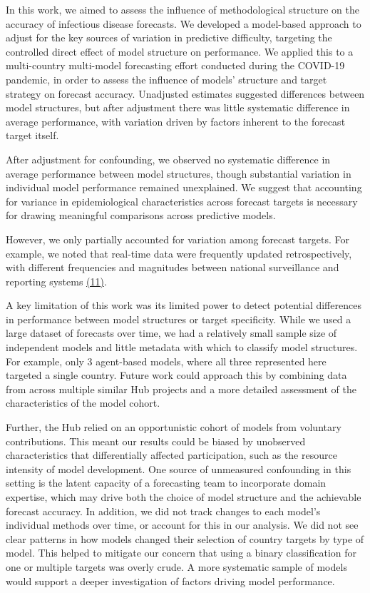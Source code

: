 \documentclass[
  letterpaper,
  DIV=11,
  numbers=noendperiod]{scrartcl}
\begin{document}
In this work, we aimed to assess the influence of methodological
structure on the accuracy of infectious disease forecasts. We developed
a model-based approach to adjust for the key sources of variation in
predictive difficulty, targeting the controlled direct effect of model
structure on performance. We applied this to a multi-country multi-model
forecasting effort conducted during the COVID-19 pandemic, in order to
assess the influence of models' structure and target strategy on
forecast accuracy. Unadjusted estimates suggested differences between
model structures, but after adjustment there was little systematic
difference in average performance, with variation driven by factors
inherent to the forecast target itself.

After adjustment for confounding, we observed no systematic difference
in average performance between model structures, though substantial
variation in individual model performance remained unexplained. We
suggest that accounting for variance in epidemiological characteristics
across forecast targets is necessary for drawing meaningful comparisons
across predictive models.

However, we only partially accounted for variation among forecast
targets. For example, we noted that real-time data were frequently
updated retrospectively, with different frequencies and magnitudes
between national surveillance and reporting systems
\href{https://www.zotero.org/google-docs/?c33gx9}{(11)}.

A key limitation of this work was its limited power to detect potential
differences in performance between model structures or target
specificity. While we used a large dataset of forecasts over time, we
had a relatively small sample size of independent models and little
metadata with which to classify model structures. For example, only 3
agent-based models, where all three represented here targeted a single
country. Future work could approach this by combining data from across
multiple similar Hub projects and a more detailed assessment of the
characteristics of the model cohort.

Further, the Hub relied on an opportunistic cohort of models from
voluntary contributions. This meant our results could be biased by
unobserved characteristics that differentially affected participation,
such as the resource intensity of model development. One source of
unmeasured confounding in this setting is the latent capacity of a
forecasting team to incorporate domain expertise, which may drive both
the choice of model structure and the achievable forecast accuracy. In
addition, we did not track changes to each model's individual methods
over time, or account for this in our analysis. We did not see clear
patterns in how models changed their selection of country targets by
type of model. This helped to mitigate our concern that using a binary
classification for one or multiple targets was overly crude. A more
systematic sample of models would support a deeper investigation of
factors driving model performance.
\end{document}
